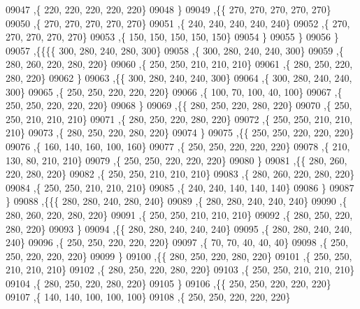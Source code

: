 \begin{DoxyCode}
09047     ,\{   220,   220,   220,   220,   220\}
09048     \}
09049    ,\{\{   270,   270,   270,   270,   270\}
09050     ,\{   270,   270,   270,   270,   270\}
09051     ,\{   240,   240,   240,   240,   240\}
09052     ,\{   270,   270,   270,   270,   270\}
09053     ,\{   150,   150,   150,   150,   150\}
09054     \}
09055    \}
09056   \}
09057  ,\{\{\{\{   300,   280,   240,   280,   300\}
09058     ,\{   300,   280,   240,   240,   300\}
09059     ,\{   280,   260,   220,   280,   220\}
09060     ,\{   250,   250,   210,   210,   210\}
09061     ,\{   280,   250,   220,   280,   220\}
09062     \}
09063    ,\{\{   300,   280,   240,   240,   300\}
09064     ,\{   300,   280,   240,   240,   300\}
09065     ,\{   250,   250,   220,   220,   220\}
09066     ,\{   100,    70,   100,    40,   100\}
09067     ,\{   250,   250,   220,   220,   220\}
09068     \}
09069    ,\{\{   280,   250,   220,   280,   220\}
09070     ,\{   250,   250,   210,   210,   210\}
09071     ,\{   280,   250,   220,   280,   220\}
09072     ,\{   250,   250,   210,   210,   210\}
09073     ,\{   280,   250,   220,   280,   220\}
09074     \}
09075    ,\{\{   250,   250,   220,   220,   220\}
09076     ,\{   160,   140,   160,   100,   160\}
09077     ,\{   250,   250,   220,   220,   220\}
09078     ,\{   210,   130,    80,   210,   210\}
09079     ,\{   250,   250,   220,   220,   220\}
09080     \}
09081    ,\{\{   280,   260,   220,   280,   220\}
09082     ,\{   250,   250,   210,   210,   210\}
09083     ,\{   280,   260,   220,   280,   220\}
09084     ,\{   250,   250,   210,   210,   210\}
09085     ,\{   240,   240,   140,   140,   140\}
09086     \}
09087    \}
09088   ,\{\{\{   280,   280,   240,   280,   240\}
09089     ,\{   280,   280,   240,   240,   240\}
09090     ,\{   280,   260,   220,   280,   220\}
09091     ,\{   250,   250,   210,   210,   210\}
09092     ,\{   280,   250,   220,   280,   220\}
09093     \}
09094    ,\{\{   280,   280,   240,   240,   240\}
09095     ,\{   280,   280,   240,   240,   240\}
09096     ,\{   250,   250,   220,   220,   220\}
09097     ,\{    70,    70,    40,    40,    40\}
09098     ,\{   250,   250,   220,   220,   220\}
09099     \}
09100    ,\{\{   280,   250,   220,   280,   220\}
09101     ,\{   250,   250,   210,   210,   210\}
09102     ,\{   280,   250,   220,   280,   220\}
09103     ,\{   250,   250,   210,   210,   210\}
09104     ,\{   280,   250,   220,   280,   220\}
09105     \}
09106    ,\{\{   250,   250,   220,   220,   220\}
09107     ,\{   140,   140,   100,   100,   100\}
09108     ,\{   250,   250,   220,   220,   220\}

\end{DoxyCode}
